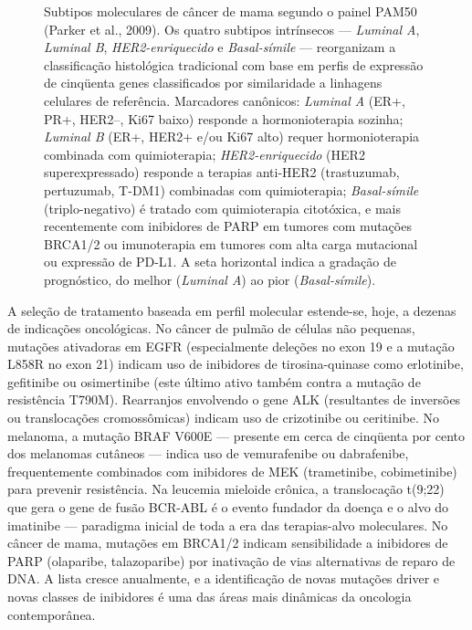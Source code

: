 \begin{figure}[ht]
\caption{Subtipos moleculares de câncer de mama segundo o painel PAM50 (Parker et al., 2009). Os quatro subtipos intrínsecos --- \emph{Luminal A}, \emph{Luminal B}, \emph{HER2-enriquecido} e \emph{Basal-símile} --- reorganizam a classificação histológica tradicional com base em perfis de expressão de cinqüenta genes classificados por similaridade a linhagens celulares de referência. Marcadores canônicos: \emph{Luminal A} (ER+, PR+, HER2--, Ki67 baixo) responde a hormonioterapia sozinha; \emph{Luminal B} (ER+, HER2+ e/ou Ki67 alto) requer hormonioterapia combinada com quimioterapia; \emph{HER2-enriquecido} (HER2 superexpressado) responde a terapias anti-HER2 (trastuzumab, pertuzumab, T-DM1) combinadas com quimioterapia; \emph{Basal-símile} (triplo-negativo) é tratado com quimioterapia citotóxica, e mais recentemente com inibidores de PARP em tumores com mutações BRCA1/2 ou imunoterapia em tumores com alta carga mutacional ou expressão de PD-L1. A seta horizontal indica a gradação de prognóstico, do melhor (\emph{Luminal A}) ao pior (\emph{Basal-símile}).}
\label{fig:13-pam50}
\end{figure}

A seleção de tratamento baseada em perfil molecular estende-se, hoje, a dezenas de indicações oncológicas. No câncer de pulmão de células não pequenas, mutações ativadoras em EGFR (especialmente deleções no exon 19 e a mutação L858R no exon 21) indicam uso de inibidores de tirosina-quinase como erlotinibe, gefitinibe ou osimertinibe (este último ativo também contra a mutação de resistência T790M). Rearranjos envolvendo o gene ALK (resultantes de inversões ou translocações cromossômicas) indicam uso de crizotinibe ou ceritinibe. No melanoma, a mutação BRAF V600E --- presente em cerca de cinqüenta por cento dos melanomas cutâneos --- indica uso de vemurafenibe ou dabrafenibe, frequentemente combinados com inibidores de MEK (trametinibe, cobimetinibe) para prevenir resistência. Na leucemia mieloide crônica, a translocação t(9;22) que gera o gene de fusão BCR-ABL é o evento fundador da doença e o alvo do imatinibe --- paradigma inicial de toda a era das terapias-alvo moleculares. No câncer de mama, mutações em BRCA1/2 indicam sensibilidade a inibidores de PARP (olaparibe, talazoparibe) por inativação de vias alternativas de reparo de DNA. A lista cresce anualmente, e a identificação de novas mutações driver e novas classes de inibidores é uma das áreas mais dinâmicas da oncologia contemporânea.

